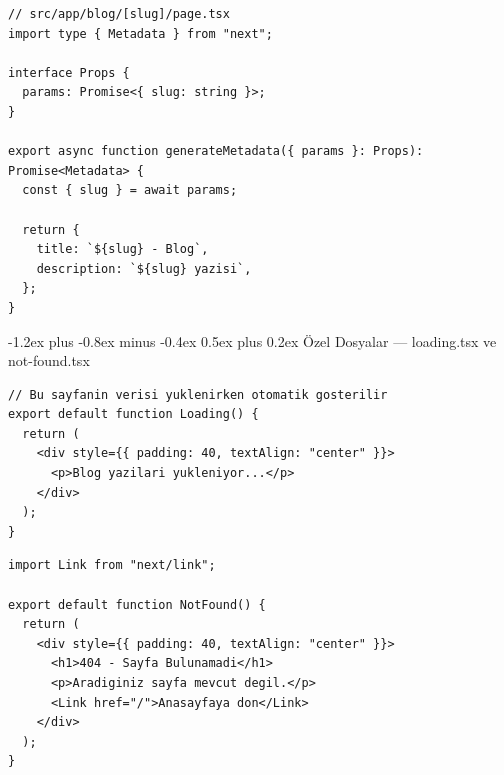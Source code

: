 \documentclass[12pt, a4paper]{article}
\makeatletter
\renewcommand{\subsection}{%
  \@startsection{subsection}{2}{\z@}%
    {-1.2ex plus -0.8ex minus -0.4ex}%
    {0.5ex plus 0.2ex}%
    {\normalfont\large\bfseries\sffamily\color{secondary}}%
}
\makeatother
\begin{document}
\vspace{6pt}

\begin{tcolorbox}[enhanced, colback=codebg, colframe=gray!30,
    colbacktitle=accent!85!black, coltitle=white, arc=4pt,
    title={\sffamily\bfseries\small Dinamik Metadata --- URL'e Göre}]
\begin{lstlisting}[style=jsxstyle]
// src/app/blog/[slug]/page.tsx
import type { Metadata } from "next";

interface Props {
  params: Promise<{ slug: string }>;
}

export async function generateMetadata({ params }: Props): Promise<Metadata> {
  const { slug } = await params;

  return {
    title: `${slug} - Blog`,
    description: `${slug} yazisi`,
  };
}
\end{lstlisting}
\end{tcolorbox}

\newpage
\subsection{Özel Dosyalar --- loading.tsx ve not-found.tsx}

\begin{tcolorbox}[enhanced, colback=codebg, colframe=gray!30,
    colbacktitle=warning!85!black, coltitle=white, arc=4pt,
    title={\sffamily\bfseries\small src/app/blog/loading.tsx}]
\begin{lstlisting}[style=jsxstyle]
// Bu sayfanin verisi yuklenirken otomatik gosterilir
export default function Loading() {
  return (
    <div style={{ padding: 40, textAlign: "center" }}>
      <p>Blog yazilari yukleniyor...</p>
    </div>
  );
}
\end{lstlisting}
\end{tcolorbox}

\vspace{6pt}

\begin{tcolorbox}[enhanced, colback=codebg, colframe=gray!30,
    colbacktitle=danger!85!black, coltitle=white, arc=4pt,
    title={\sffamily\bfseries\small src/app/not-found.tsx}]
\begin{lstlisting}[style=jsxstyle]
import Link from "next/link";

export default function NotFound() {
  return (
    <div style={{ padding: 40, textAlign: "center" }}>
      <h1>404 - Sayfa Bulunamadi</h1>
      <p>Aradiginiz sayfa mevcut degil.</p>
      <Link href="/">Anasayfaya don</Link>
    </div>
  );
}
\end{lstlisting}
\end{tcolorbox}
\end{document}
